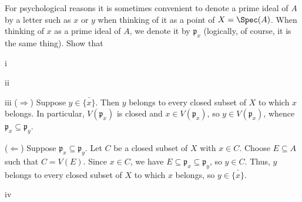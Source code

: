 \begin{exercise}
For psychological reasons it is sometimes convenient to denote a prime ideal of \(A\) by a letter such as \(x\) or \(y\) when thinking of it as a point of \(X = \Spec(A)\).
When thinking of \(x\) as a prime ideal of \(A\), we denote it by \(\mathfrak p_x\) (logically, of course, it is the same thing).
Show that
\end{exercise}

\begin{partsolution}{i}

\end{partsolution}

\begin{partsolution}{ii}

\end{partsolution}

\begin{partsolution}{iii}
(\(\Rightarrow\))
Suppose \(y \in \bar{\{x\}}\).
Then \(y\) belongs to every closed subset of \(X\) to which \(x\) belongs.
In particular, \(V(\mathfrak{p}_x)\) is closed and \(x \in V(\mathfrak{p}_x)\), so \(y \in V(\mathfrak{p}_x)\), whence \(\mathfrak{p}_x \subseteq \mathfrak{p}_y\).

(\(\Leftarrow\))
Suppose \(\mathfrak{p}_x \subseteq \mathfrak{p}_y\).
Let \(C\) be a closed subset of \(X\) with \(x \in C\).
Choose \(E \subseteq A\) such that \(C = V(E)\).
Since \(x \in C\), we have \(E \subseteq \mathfrak{p}_x \subseteq \mathfrak{p}_y\), so \(y \in C\).
Thus, \(y\) belongs to every closed subset of \(X\) to which \(x\) belongs, so \(y \in \bar{\{x\}}\).
\end{partsolution}

\begin{partsolution}{iv}

\end{partsolution}
